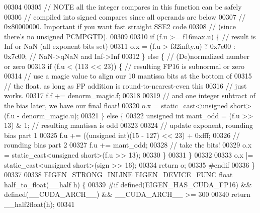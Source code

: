 \begin{DoxyCode}
00304 
00305   \textcolor{comment}{// NOTE all the integer compares in this function can be safely}
00306   \textcolor{comment}{// compiled into signed compares since all operands are below}
00307   \textcolor{comment}{// 0x80000000. Important if you want fast straight SSE2 code}
00308   \textcolor{comment}{// (since there's no unsigned PCMPGTD).}
00309 
00310   \textcolor{keywordflow}{if} (f.u >= f16max.u) \{  \textcolor{comment}{// result is Inf or NaN (all exponent bits set)}
00311     o.x = (f.u > f32infty.u) ? 0x7e00 : 0x7c00; \textcolor{comment}{// NaN->qNaN and Inf->Inf}
00312   \} \textcolor{keywordflow}{else} \{  \textcolor{comment}{// (De)normalized number or zero}
00313     \textcolor{keywordflow}{if} (f.u < (113 << 23)) \{  \textcolor{comment}{// resulting FP16 is subnormal or zero}
00314       \textcolor{comment}{// use a magic value to align our 10 mantissa bits at the bottom of}
00315       \textcolor{comment}{// the float. as long as FP addition is round-to-nearest-even this}
00316       \textcolor{comment}{// just works.}
00317       f.f += denorm\_magic.f;
00318 
00319       \textcolor{comment}{// and one integer subtract of the bias later, we have our final float!}
00320       o.x = \textcolor{keyword}{static\_cast<}\textcolor{keywordtype}{unsigned} \textcolor{keywordtype}{short}\textcolor{keyword}{>}(f.u - denorm\_magic.u);
00321     \} \textcolor{keywordflow}{else} \{
00322       \textcolor{keywordtype}{unsigned} \textcolor{keywordtype}{int} mant\_odd = (f.u >> 13) & 1; \textcolor{comment}{// resulting mantissa is odd}
00323 
00324       \textcolor{comment}{// update exponent, rounding bias part 1}
00325       f.u += ((\textcolor{keywordtype}{unsigned} int)(15 - 127) << 23) + 0xfff;
00326       \textcolor{comment}{// rounding bias part 2}
00327       f.u += mant\_odd;
00328       \textcolor{comment}{// take the bits!}
00329       o.x = \textcolor{keyword}{static\_cast<}\textcolor{keywordtype}{unsigned} \textcolor{keywordtype}{short}\textcolor{keyword}{>}(f.u >> 13);
00330     \}
00331   \}
00332 
00333   o.x |= \textcolor{keyword}{static\_cast<}\textcolor{keywordtype}{unsigned} \textcolor{keywordtype}{short}\textcolor{keyword}{>}(sign >> 16);
00334   \textcolor{keywordflow}{return} o;
00335 \textcolor{preprocessor}{#endif}
00336 \}
00337 
00338 EIGEN\_STRONG\_INLINE EIGEN\_DEVICE\_FUNC \textcolor{keywordtype}{float} half\_to\_float(\_\_half h) \{
00339 \textcolor{preprocessor}{#if defined(EIGEN\_HAS\_CUDA\_FP16) && defined(\_\_CUDA\_ARCH\_\_) && \_\_CUDA\_ARCH\_\_ >= 300}
00340   \textcolor{keywordflow}{return} \_\_half2float(h);
00341 

\end{DoxyCode}
